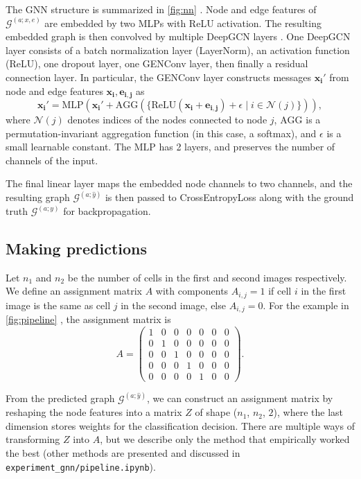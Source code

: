 \documentclass[10pt,conference,compsocconf,a4paper]{IEEEtran}
\newcommand{\G}{\mathcal{G}}
\renewcommand{\vec}[1]{\boldsymbol{#1}}
\newcommand*{\shortautoref}[1]{%
	\begingroup
	\def\equationautorefname{\textsc{Eq.}}%
	\def\tableautorefname{\textsc{Tab.}}%
	\def\figureautorefname{\textsc{Fig.}}%
	\autoref{#1}%
	\endgroup
}
\begin{document}
		The GNN structure is summarized in \shortautoref{fig:nn}. Node and edge features of $\G^{(a;x,e)}$ are embedded by two MLPs with ReLU activation. The resulting embedded graph is then convolved by multiple DeepGCN layers \cite{li_deepergcn_2020}. One DeepGCN layer consists of a batch normalization layer (LayerNorm), an activation function (ReLU), one dropout layer, one GENConv layer, then finally a residual connection layer. In particular, the GENConv layer constructs messages $\vec{x_i}'$ from node and edge features $\vec{x_i}, \vec{e_{i,j}}$ as
		$$
			\vec{x_i}' = \textrm{MLP}(\vec{x_i}' + \textrm{AGG}(\{\textrm{ReLU}(\vec{x_i} + \vec{e_{i,j}}) + \epsilon \;|\; i \in \mathcal{N}(j)\})),
		$$
		where $\mathcal{N}(j)$ denotes indices of the nodes connected to node $j$, $\textrm{AGG}$ is a permutation-invariant aggregation function (in this case, a softmax), and $\epsilon$ is a small learnable constant. The $\textrm{MLP}$ has 2 layers, and preserves the number of channels of the input.

		The final linear layer maps the embedded node channels to two channels, and the resulting graph $\G^{(a;\hat y)}$ is then passed to CrossEntropyLoss along with the ground truth $\G^{(a;y)}$ for backpropagation.

	\subsection{Making predictions} \label{sec:methods:pred}

		Let $n_1$ and $n_2$ be the number of cells in the first and second images respectively. We define an assignment matrix $A$ with components $A_{i,j} = 1$ if cell $i$ in the first image is the same as cell $j$ in the second image, else $A_{i,j} = 0$. For the example in \shortautoref{fig:pipeline}, the assignment matrix is
		$$
			A = \begin{pmatrix}
				1 & 0 & 0 & 0 & 0 & 0 & 0 \\
				0 & 1 & 0 & 0 & 0 & 0 & 0 \\
				0 & 0 & 1 & 0 & 0 & 0 & 0 \\
				0 & 0 & 0 & 1 & 0 & 0 & 0 \\
				0 & 0 & 0 & 0 & 1 & 0 & 0
			\end{pmatrix}.
		$$

		From the predicted graph $\G^{(a;\hat y)}$, we can construct an assignment matrix by reshaping the node features into a matrix $Z$ of shape ($n_1$, $n_2$, $2$), where the last dimension stores weights for the classification decision. There are multiple ways of transforming $Z$ into $A$, but we describe only the method that empirically worked the best (other methods are presented and discussed in \texttt{experiment\_gnn/pipeline.ipynb}).
\end{document}

